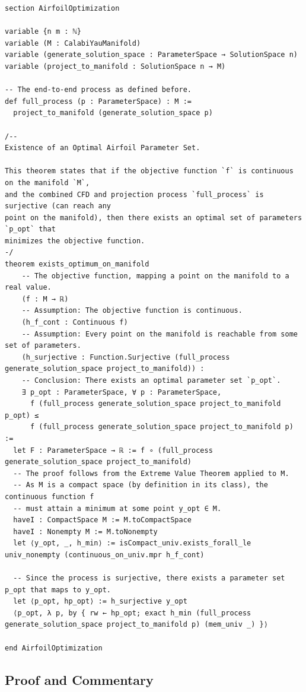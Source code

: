 \documentclass{article}
\begin{document}
\begin{verbatim}
section AirfoilOptimization

variable {n m : ℕ}
variable (M : CalabiYauManifold)
variable (generate_solution_space : ParameterSpace → SolutionSpace n)
variable (project_to_manifold : SolutionSpace n → M)

-- The end-to-end process as defined before.
def full_process (p : ParameterSpace) : M :=
  project_to_manifold (generate_solution_space p)

/--
Existence of an Optimal Airfoil Parameter Set.

This theorem states that if the objective function `f` is continuous on the manifold `M`,
and the combined CFD and projection process `full_process` is surjective (can reach any
point on the manifold), then there exists an optimal set of parameters `p_opt` that
minimizes the objective function.
-/
theorem exists_optimum_on_manifold
    -- The objective function, mapping a point on the manifold to a real value.
    (f : M → ℝ)
    -- Assumption: The objective function is continuous.
    (h_f_cont : Continuous f)
    -- Assumption: Every point on the manifold is reachable from some set of parameters.
    (h_surjective : Function.Surjective (full_process generate_solution_space project_to_manifold)) :
    -- Conclusion: There exists an optimal parameter set `p_opt`.
    ∃ p_opt : ParameterSpace, ∀ p : ParameterSpace,
      f (full_process generate_solution_space project_to_manifold p_opt) ≤
      f (full_process generate_solution_space project_to_manifold p) :=
  let F : ParameterSpace → ℝ := f ∘ (full_process generate_solution_space project_to_manifold)
  -- The proof follows from the Extreme Value Theorem applied to M.
  -- As M is a compact space (by definition in its class), the continuous function f
  -- must attain a minimum at some point y_opt ∈ M.
  haveI : CompactSpace M := M.toCompactSpace
  haveI : Nonempty M := M.toNonempty
  let ⟨y_opt, _, h_min⟩ := isCompact_univ.exists_forall_le univ_nonempty (continuous_on_univ.mpr h_f_cont)

  -- Since the process is surjective, there exists a parameter set p_opt that maps to y_opt.
  let ⟨p_opt, hp_opt⟩ := h_surjective y_opt
  ⟨p_opt, λ p, by { rw ← hp_opt; exact h_min (full_process generate_solution_space project_to_manifold p) (mem_univ _) }⟩

end AirfoilOptimization
\end{verbatim}

\subsection{Proof and Commentary}
\end{document}
